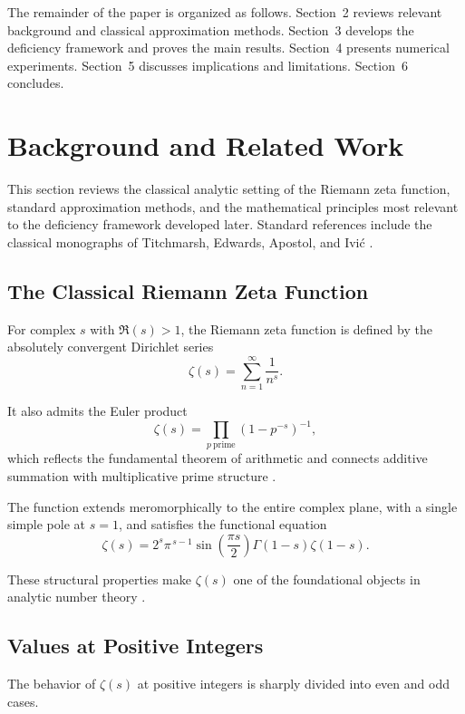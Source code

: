 \documentclass[11pt]{article}
\numberwithin{equation}{section}
\theoremstyle{definition}
\begin{document}
The remainder of the paper is organized as follows. Section~2 reviews relevant background and classical approximation methods. Section~3 develops the deficiency framework and proves the main results. Section~4 presents numerical experiments. Section~5 discusses implications and limitations. Section~6 concludes.

\section{Background and Related Work}

This section reviews the classical analytic setting of the Riemann zeta function, standard approximation methods, and the mathematical principles most relevant to the deficiency framework developed later. Standard references include the classical monographs of Titchmarsh, Edwards, Apostol, and Ivić \cite{titchmarsh1986zeta,edwards1974riemann,apostol1976analytic}.

\subsection{The Classical Riemann Zeta Function}

For complex \(s\) with \(\Re(s)>1\), the Riemann zeta function is defined by the absolutely convergent Dirichlet series
\[
\zeta(s)=\sum_{n=1}^{\infty}\frac{1}{n^s}.
\]

It also admits the Euler product
\[
\zeta(s)=\prod_{p\ \mathrm{prime}}\left(1-p^{-s}\right)^{-1},
\]
which reflects the fundamental theorem of arithmetic and connects additive summation with multiplicative prime structure \cite{apostol1976analytic,hardywright2008}.

The function extends meromorphically to the entire complex plane, with a single simple pole at \(s=1\), and satisfies the functional equation
\[
\zeta(s)=2^s\pi^{\,s-1}\sin\!\left(\frac{\pi s}{2}\right)\Gamma(1-s)\zeta(1-s).
\]

These structural properties make \(\zeta(s)\) one of the foundational objects in analytic number theory \cite{riemann1859,titchmarsh1986zeta}.

\subsection{Values at Positive Integers}

The behavior of \(\zeta(s)\) at positive integers is sharply divided into even and odd cases.
\end{document}
